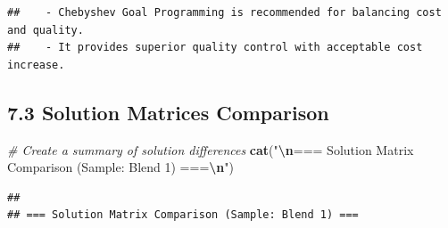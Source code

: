 \documentclass[
]{article}
\newenvironment{Shaded}{\begin{snugshade}}{\end{snugshade}}
\newcommand{\CommentTok}[1]{\textcolor[rgb]{0.56,0.35,0.01}{\textit{#1}}}
\newcommand{\ControlFlowTok}[1]{\textcolor[rgb]{0.13,0.29,0.53}{\textbf{#1}}}
\newcommand{\DecValTok}[1]{\textcolor[rgb]{0.00,0.00,0.81}{#1}}
\newcommand{\FloatTok}[1]{\textcolor[rgb]{0.00,0.00,0.81}{#1}}
\newcommand{\FunctionTok}[1]{\textcolor[rgb]{0.13,0.29,0.53}{\textbf{#1}}}
\newcommand{\NormalTok}[1]{#1}
\newcommand{\SpecialCharTok}[1]{\textcolor[rgb]{0.81,0.36,0.00}{\textbf{#1}}}
\newcommand{\StringTok}[1]{\textcolor[rgb]{0.31,0.60,0.02}{#1}}
\begin{document}
\begin{Shaded}
\end{Shaded}

\begin{verbatim}
##    - Chebyshev Goal Programming is recommended for balancing cost and quality.
##    - It provides superior quality control with acceptable cost increase.
\end{verbatim}

\subsection{7.3 Solution Matrices
Comparison}\label{solution-matrices-comparison}

\begin{Shaded}
\begin{Highlighting}[]
\CommentTok{\# Create a summary of solution differences}
\FunctionTok{cat}\NormalTok{(}\StringTok{"}\SpecialCharTok{\textbackslash{}n}\StringTok{=== Solution Matrix Comparison (Sample: Blend 1) ===}\SpecialCharTok{\textbackslash{}n}\StringTok{"}\NormalTok{)}
\end{Highlighting}
\end{Shaded}

\begin{verbatim}
## 
## === Solution Matrix Comparison (Sample: Blend 1) ===
\end{verbatim}
\end{document}
